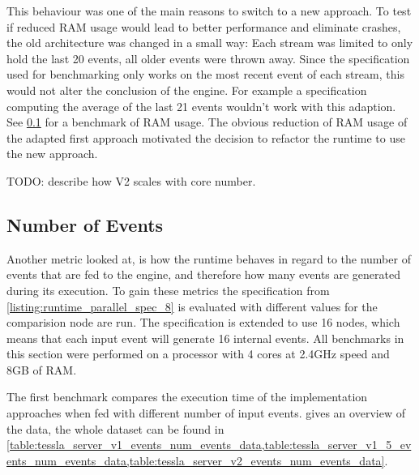 This behaviour was one of the main reasons to switch to a new approach.
To test if reduced RAM usage would lead to better performance and eliminate crashes, the old architecture was changed in a small way: Each stream was limited to only hold the last 20 events, all older events were thrown away.
Since the specification used for benchmarking only works on the most recent event of each stream, this would not alter the conclusion of the engine.
For example a specification computing the average of the last 21 events wouldn't work with this adaption.
See \cref{sec:evaluation:runtime_benchmarks:num_events} for a benchmark of RAM usage.
The obvious reduction of RAM usage of the adapted first approach motivated the decision to refactor the runtime to use the new approach.

TODO: describe how V2 scales with core number.

\subsection{Number of Events}
\label{sec:evaluation:runtime_benchmarks:num_events}

Another metric looked at, is how the runtime behaves in regard to the number of events that are fed to the engine, and therefore how many events are generated during its execution.
To gain these metrics the specification from \cref{listing:runtime_parallel_spec_8} is evaluated with different values for the comparision node are run.
The specification is extended to use 16 nodes, which means that each input event will generate 16 internal events.
All benchmarks in this section were performed on a processor with 4 cores at 2.4GHz speed and 8GB of RAM.

The first benchmark compares the execution time of the implementation approaches when fed with different number of input events.
 gives an overview of the data, the whole dataset can be found in \cref{table:tessla_server_v1_events_num_events_data,table:tessla_server_v1_5_events_num_events_data,table:tessla_server_v2_events_num_events_data}.

